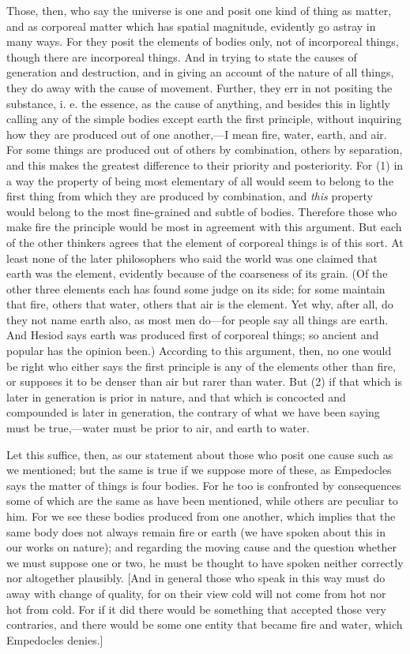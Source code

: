 
Those, then, who say the universe is one and posit one kind of thing as matter, and as corporeal matter which has spatial magnitude, evidently go astray in many ways. For they posit the elements of bodies only, not of incorporeal things, though there are incorporeal things. And in trying to state the causes of generation and destruction, and in giving an account of the nature of all things, they do away with the cause of movement. Further, they err in not positing the substance, i. e. the essence, as the cause of anything, and besides this in lightly calling any of the simple bodies except earth the first principle, without inquiring how they are produced out of one another,—I mean fire, water, earth, and air. For some things are produced out of others by combination, others by separation, and this makes the greatest difference to their priority and posteriority. For (1) in a way the property of being most elementary of all would seem to belong to the first thing from which they are produced by combination, and \emph{this} property would belong to the most fine-grained and subtle of bodies. Therefore those who make fire the principle would be most in agreement with this argument. But each of the other thinkers agrees that the element of corporeal things is of this sort. At least none of the later philosophers who said the world was one claimed that earth was the element, evidently because of the coarseness of its grain. (Of the other three elements each has found some judge on its side; for some maintain that fire, others that water, others that air is the element. Yet why, after all, do they not name earth also, as most men do—for people say all things are earth. And Hesiod says earth was produced first of corporeal things; so ancient and popular has the opinion been.) According to this argument, then, no one would be right who either says the first principle is any of the elements other than fire, or supposes it to be denser than air but rarer than water. But (2) if that which is later in generation is prior in nature, and that which is concocted and compounded is later in generation, the contrary of what we have been saying must be true,—water must be prior to air, and earth to water.

Let this suffice, then, as our statement about those who posit one cause such as we mentioned; but the same is true if we suppose more of these, as Empedocles says the matter of things is four bodies. For he too is confronted by consequences some of which are the same as have been mentioned, while others are peculiar to him. For we see these bodies produced from one another, which implies that the same body does not always remain fire or earth (we have spoken about this in our works on nature); and regarding the moving cause and the question whether we must suppose one or two, he must be thought to have spoken neither correctly nor altogether plausibly. [And in general those who speak in this way must do away with change of quality, for on their view cold will not come from hot nor hot from cold. For if it did there would be something that accepted those very contraries, and there would be some one entity that became fire and water, which Empedocles denies.]

